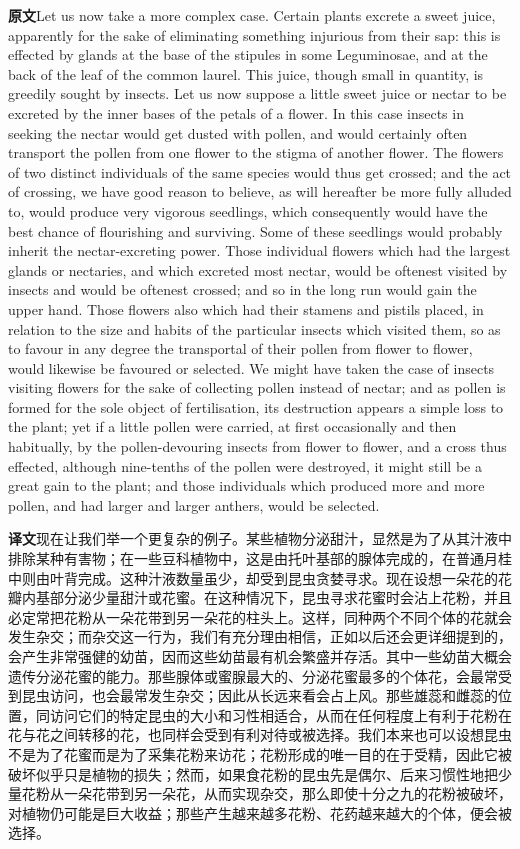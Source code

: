 \documentclass[UTF8,zihao=-4]{ctexart}
\newcommand{\BodyFont}{\fontsize{10.5pt}{15.5pt}\selectfont}
\newcommand{\origlabel}{\textbf{原文}\quad}
\newcommand{\translabel}{\textbf{译文}\quad}
\newenvironment{enblock}{\par\noindent\begingroup\BodyFont\origlabel}{\par\endgroup}
\newenvironment{zhblock}{\par\noindent\begingroup\BodyFont\translabel}{\par\endgroup\vspace{0.35em}}
\newcommand{\pair}[2]{\begin{enblock}#1\end{enblock}\begin{zhblock}#2\end{zhblock}}
\begin{document}
\pair{Let us now take a more complex case. Certain plants excrete a sweet juice, apparently for the sake of eliminating something injurious from their sap: this is effected by glands at the base of the stipules in some Leguminosae, and at the back of the leaf of the common laurel. This juice, though small in quantity, is greedily sought by insects. Let us now suppose a little sweet juice or nectar to be excreted by the inner bases of the petals of a flower. In this case insects in seeking the nectar would get dusted with pollen, and would certainly often transport the pollen from one flower to the stigma of another flower. The flowers of two distinct individuals of the same species would thus get crossed; and the act of crossing, we have good reason to believe, as will hereafter be more fully alluded to, would produce very vigorous seedlings, which consequently would have the best chance of flourishing and surviving. Some of these seedlings would probably inherit the nectar-excreting power. Those individual flowers which had the largest glands or nectaries, and which excreted most nectar, would be oftenest visited by insects and would be oftenest crossed; and so in the long run would gain the upper hand. Those flowers also which had their stamens and pistils placed, in relation to the size and habits of the particular insects which visited them, so as to favour in any degree the transportal of their pollen from flower to flower, would likewise be favoured or selected. We might have taken the case of insects visiting flowers for the sake of collecting pollen instead of nectar; and as pollen is formed for the sole object of fertilisation, its destruction appears a simple loss to the plant; yet if a little pollen were carried, at first occasionally and then habitually, by the pollen-devouring insects from flower to flower, and a cross thus effected, although nine-tenths of the pollen were destroyed, it might still be a great gain to the plant; and those individuals which produced more and more pollen, and had larger and larger anthers, would be selected.}{现在让我们举一个更复杂的例子。某些植物分泌甜汁，显然是为了从其汁液中排除某种有害物；在一些豆科植物中，这是由托叶基部的腺体完成的，在普通月桂中则由叶背完成。这种汁液数量虽少，却受到昆虫贪婪寻求。现在设想一朵花的花瓣内基部分泌少量甜汁或花蜜。在这种情况下，昆虫寻求花蜜时会沾上花粉，并且必定常把花粉从一朵花带到另一朵花的柱头上。这样，同种两个不同个体的花就会发生杂交；而杂交这一行为，我们有充分理由相信，正如以后还会更详细提到的，会产生非常强健的幼苗，因而这些幼苗最有机会繁盛并存活。其中一些幼苗大概会遗传分泌花蜜的能力。那些腺体或蜜腺最大的、分泌花蜜最多的个体花，会最常受到昆虫访问，也会最常发生杂交；因此从长远来看会占上风。那些雄蕊和雌蕊的位置，同访问它们的特定昆虫的大小和习性相适合，从而在任何程度上有利于花粉在花与花之间转移的花，也同样会受到有利对待或被选择。我们本来也可以设想昆虫不是为了花蜜而是为了采集花粉来访花；花粉形成的唯一目的在于受精，因此它被破坏似乎只是植物的损失；然而，如果食花粉的昆虫先是偶尔、后来习惯性地把少量花粉从一朵花带到另一朵花，从而实现杂交，那么即使十分之九的花粉被破坏，对植物仍可能是巨大收益；那些产生越来越多花粉、花药越来越大的个体，便会被选择。}
\end{document}
